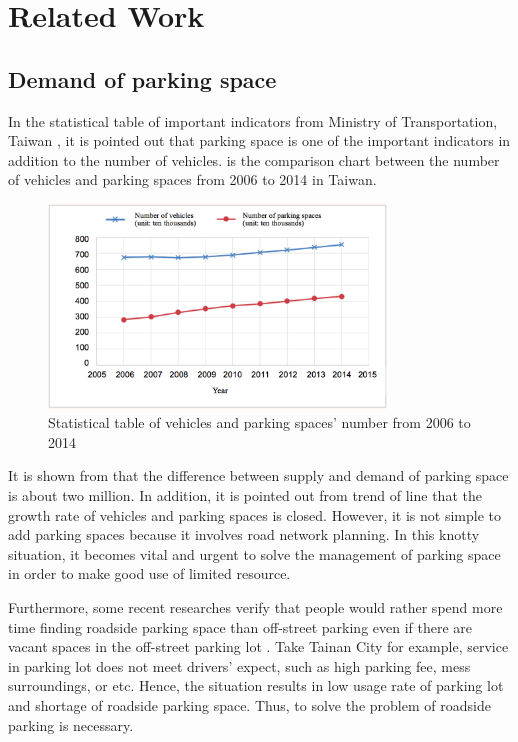 \documentclass[journal,article,submit,moreauthors,pdftex,10pt,a4paper]{mdpi}
\begin{document}
\section{Related Work}\label{sec:relatedWork}

%
\subsection{Demand of parking space}
%

In the statistical table of important indicators from Ministry of
Transportation, Taiwan \cite{motc}, it is pointed out that parking space is one
of the important indicators in addition to the number of vehicles.
 is the comparison chart between the number of vehicles and
parking spaces from 2006 to 2014 in Taiwan.

\begin{figure}[tbp]
\begin{center}
\includegraphics[width=0.8\textwidth]{Figures/Statistical_Table.png}
\end{center}
\caption{Statistical table of vehicles and parking spaces' number from
2006 to 2014}
\label{fig:StatisticalTable}
\end{figure}

It is shown from  that the difference between supply and demand
of parking space is about two million. In addition, it is pointed out
from trend of line that the growth rate of vehicles and parking spaces
is closed. However, it is not simple to add parking spaces because it
involves road network planning. In this knotty situation, it becomes
vital and urgent to solve the management of parking space in order to
make good use of limited resource.

Furthermore, some recent researches verify that people would rather
spend more time finding roadside parking space than off-street parking
even if there are vacant spaces in the off-street parking lot \cite{OnStreetParking}. Take
Tainan City for example, service in parking lot does not meet drivers'
expect, such as high parking fee, mess surroundings, or etc. Hence, the
situation results in low usage rate of parking lot and shortage of
roadside parking space. Thus, to solve the problem of roadside parking
is necessary.
\end{document}
